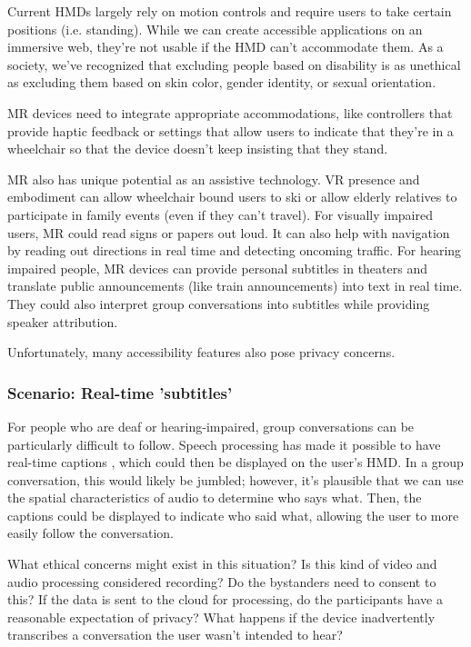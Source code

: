 Current HMDs largely rely on motion controls and require users to take certain positions (i.e. standing). While we can create accessible applications on an immersive web, they're not usable if the HMD can't accommodate them. As a society, we've recognized that excluding people based on disability is as unethical as excluding them based on skin color, gender identity, or sexual orientation.

MR devices need to integrate appropriate accommodations, like controllers that provide haptic feedback \cite{zhao2018demonstration} or settings that allow users to indicate that they're in a wheelchair so that the device doesn't keep insisting that they stand.

MR also has unique potential as an assistive technology. VR presence and embodiment can allow wheelchair bound users to ski \cite{harrell} or allow elderly relatives to participate in family events (even if they can't travel). For visually impaired users, MR could read signs or papers out loud. It can also help with navigation by reading out directions in real time and detecting oncoming traffic. For hearing impaired people, MR devices can provide personal subtitles in theaters \cite{forrest} and translate public announcements (like train announcements) into text in real time. They could also interpret group conversations into subtitles while providing speaker attribution.

Unfortunately, many accessibility features also pose privacy concerns.

\subsubsection{Scenario: Real-time 'subtitles'}

For people who are deaf or hearing-impaired, group conversations can be particularly difficult to follow. Speech processing has made it possible to have real-time captions \cite{welch}, which could then be displayed on the user's HMD. In a group conversation, this would likely be jumbled; however, it's plausible that we can use the spatial characteristics of audio to determine who says what. Then, the captions could be displayed to indicate who said what, allowing the user to more easily follow the conversation.

What ethical concerns might exist in this situation? Is this kind of video and audio processing considered recording? Do the bystanders need to consent to this? If the data is sent to the cloud for processing, do the participants have a reasonable expectation of privacy? What happens if the device inadvertently transcribes a conversation the user wasn't intended to hear?

